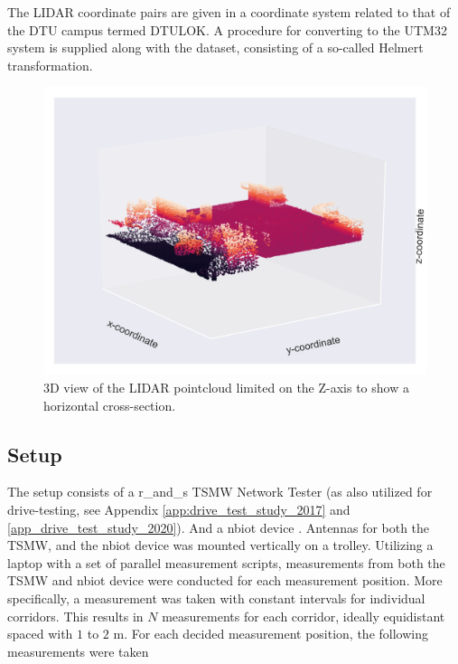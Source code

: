 The LIDAR coordinate pairs are given in a coordinate system related to that of the DTU campus termed DTULOK. A procedure for converting to the UTM32 system is supplied along with the dataset, consisting of a so-called Helmert transformation. 


\begin{figure}
    \centering
    \includegraphics[width=\textwidth]{chapters/part_pathloss/figures/outdoor_to_indoor/3d_view.png}
    \caption{$3$D view of the LIDAR pointcloud limited on the Z-axis to show a horizontal cross-section.}
    \label{fig:tunnel_3d_view}
\end{figure}


\subsection{Setup}

The setup consists of a \gls{r_and_s} TSMW Network Tester \cite{Manual2017} (as also utilized for drive-testing, see Appendix \ref{app:drive_test_study_2017} and \ref{app_drive_test_study_2020}). And a \gls{nbiot} device \cite{sodaq}. Antennas for both the TSMW, and the \gls{nbiot} device was mounted vertically on a trolley. Utilizing a laptop with a set of parallel measurement scripts, measurements from both the TSMW and \gls{nbiot} device were conducted for each measurement position. More specifically, a measurement was taken with constant intervals for individual corridors. This results in $N$ measurements for each corridor, ideally equidistant spaced with $1$ to $2$ m. For each decided measurement position, the following measurements were taken

